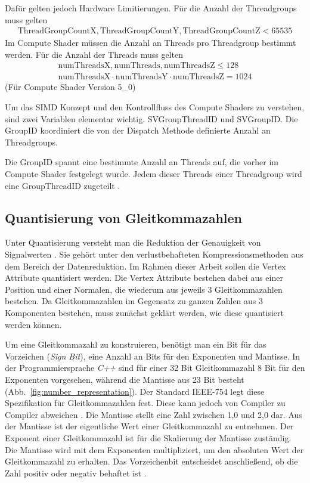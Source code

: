 Dafür gelten jedoch Hardware Limitierungen.
Für die Anzahl der Threadgroups muss gelten
\begin{gather*}
	\mathrm{ThreadGroupCountX, ThreadGroupCountY, ThreadGroupCountZ} < 65535
\end{gather*}
Im Compute Shader müssen die Anzahl an Threads pro Threadgroup bestimmt werden.
Für die Anzahl der Threads muss gelten
\begin{gather*}
	\mathrm{numThreadsX, numThreads, numThreadsZ} \leq 128 \\
	\mathrm{numThreadsX} \cdot \mathrm{numThreadsY} \cdot \mathrm{numThreadsZ} = 1024
\end{gather*}
(Für Compute Shader Version 5\_0)

Um das SIMD Konzept und den Kontrollfluss des Compute Shaders zu verstehen, sind zwei Variablen elementar wichtig.
SVGroupThreadID und SVGroupID.
Die GroupID koordiniert die von der Dispatch Methode definierte Anzahl an Threadgroups.

Die GroupID spannt eine bestimmte Anzahl an Threads auf, die vorher im Compute Shader festgelegt wurde.
Jedem dieser Threads einer Threadgroup wird eine GroupThreadID zugeteilt \cite{Mic2021b}.

\subsection{Quantisierung von Gleitkommazahlen}
\label{subsec:quantisierung}
Unter Quantisierung versteht man die Reduktion der Genauigkeit von Signalwerten \cite{Strutz2009}.
Sie gehört unter den verlustbehafteten Kompressionsmethoden aus dem Bereich der Datenreduktion.
Im Rahmen dieser Arbeit sollen die Vertex Attribute quantisiert werden.
Die Vertex Attribute bestehen dabei aus einer Position und einer Normalen, die wiederum aus jeweils 3 Gleitkommazahlen bestehen.
Da Gleitkommazahlen im Gegensatz zu ganzen Zahlen aus 3 Komponenten bestehen, muss zunächst geklärt werden, wie diese quantisiert werden können. \newline

Um eine Gleitkommazahl zu konstruieren, benötigt man ein Bit für das Vorzeichen (\textit{Sign Bit}), eine Anzahl an Bits für den Exponenten und Mantisse.
In der Programmiersprache \textit{C++} sind für einer 32 Bit Gleitkommazahl 8 Bit für den Exponenten vorgesehen, während die Mantisse aus 23 Bit besteht (Abb.~\ref{fig:number_representation}).
Der Standard IEEE-754 legt diese Spezifikation für Gleitkommazahlen fest.
Diese kann jedoch von Compiler zu Compiler abweichen \cite{Microsoft2023}.
Die Mantisse stellt eine Zahl zwischen 1,0 und 2,0 dar.
Aus der Mantisse ist der eigentliche Wert einer Gleitkommazahl zu entnehmen.
Der Exponent einer Gleitkommazahl ist für die Skalierung der Mantisse zuständig.
Die Mantisse wird mit dem Exponenten multipliziert, um den absoluten Wert der Gleitkommazahl zu erhalten.
Das Vorzeichenbit entscheidet anschließend, ob die Zahl positiv oder negativ behaftet ist \cite{Widrow_Kollár_2008}. \newline

